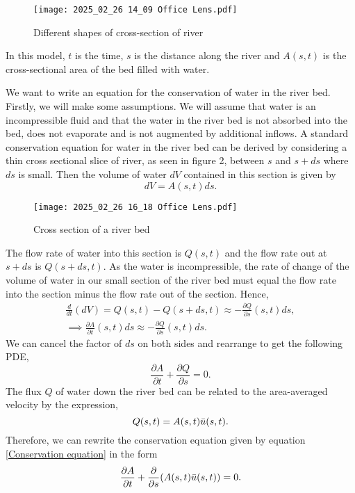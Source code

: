 \documentclass[12pt]{article}
\begin{document}
\begin{figure}
    \centering
    \texttt{[image: 2025\_02\_26 14\_09 Office Lens.pdf]}
    \caption{Different shapes of cross-section of river}
    \label{fig:enter-label}
\end{figure}

In this model, $t$ is the time, $s$ is the distance along the river and $A(s,t)$ is the cross-sectional area of the bed filled with water.  

We want to write an equation for the conservation of water in the river bed.  Firstly, we will make some assumptions.  We will assume that water is an incompressible fluid and that the water in the river bed is not absorbed into the bed, does not evaporate and is not augmented by additional inflows. A standard conservation equation for water in the river bed can be derived by considering a thin cross sectional slice of river, as seen in figure 2, between $s$ and $s+ds$ where $ds$ is small.  Then the volume of water $dV$ contained in this section is given by
\begin{equation}
    dV=A(s,t)ds.
\end{equation}
\begin{figure}
    \centering
    \texttt{[image: 2025\_02\_26 16\_18 Office Lens.pdf]}
    \caption{Cross section of a river bed}
    \label{fig:enter-label}
\end{figure}
The flow rate of water into this section is $Q(s,t)$ and the flow rate out at $s+ds$ is $Q(s+ds,t)$.  As the water is incompressible, the rate of change of the volume of water in our small section of the river bed must equal the flow rate into the section minus the flow rate out of the section.  Hence,
\begin{align}
    \frac{d}{dt}(dV) = Q(s,t) - Q(s+ds,t) \approx -\frac{\partial Q}{\partial s}(s,t)ds, \\
    \implies \frac{\partial A}{\partial t}(s,t)ds \approx -\frac{\partial Q}{\partial s}(s,t)ds.
\end{align}
We can cancel the factor of $ds$ on both sides and rearrange to get the following PDE,
\begin{equation} \label{Conservation equation}
    \frac{\partial A}{\partial t} + \frac{\partial Q}{\partial s} =0.
\end{equation}
The flux $Q$ of water down the river bed can be related to the area-averaged velocity by the expression,
\begin{equation}
    Q(s,t) = A(s,t)\Bar{u}(s,t).
\end{equation}
Therefore, we can rewrite the conservation equation given by equation \ref{Conservation equation} in the form
\begin{equation}
    \frac{\partial A}{\partial t} + \frac{\partial}{\partial s}(A(s,t)\Bar{u}(s,t)) = 0.
\end{equation}
\end{document}
